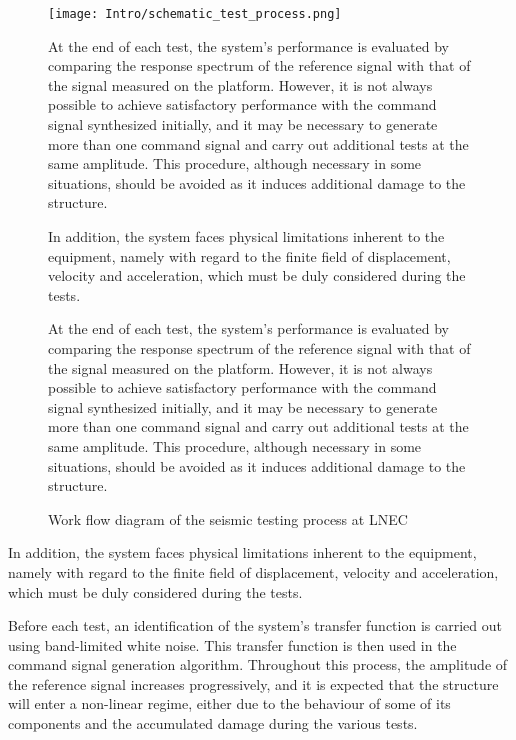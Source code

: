 \documentclass[9pt]{extarticle}
\begin{document}
\begin{figure}[H]
\begin{minipage}{0.4\textwidth}
    \centering
    \texttt{[image: Intro/schematic\_test\_process.png]}
    \caption{Work flow diagram of the seismic testing process at LNEC}
    \label{schematic_test_process}
\end{minipage}
\hfill
\begin{minipage}{0.55\textwidth} \setlength{\parindent}{4pt}

\hspace*{\parindent} At the end of each test, the system's performance is evaluated by comparing the response spectrum of the reference signal with that of the signal measured on the platform. However, it is not always possible to achieve satisfactory performance with the command signal synthesized initially, and it may be necessary to generate more than one command signal and carry out additional tests at the same amplitude. This procedure, although necessary in some situations, should be avoided as it induces additional damage to the structure.

\hspace*{\parindent} In addition, the system faces physical limitations inherent to the equipment, namely with regard to the finite field of displacement, velocity and acceleration, which must be duly considered during the tests.

\hspace*{\parindent} At the end of each test, the system's performance is evaluated by comparing the response spectrum of the reference signal with that of the signal measured on the platform. However, it is not always possible to achieve satisfactory performance with the command signal synthesized initially, and it may be necessary to generate more than one command signal and carry out additional tests at the same amplitude. This procedure, although necessary in some situations, should be avoided as it induces additional damage to the structure.

\end{minipage}
\end{figure}

In addition, the system faces physical limitations inherent to the equipment, namely with regard to the finite field of displacement, velocity and acceleration, which must be duly considered during the tests.

Before each test, an identification of the system's transfer function is carried out using band-limited white noise.%
This transfer function is then used in the command signal generation algorithm. Throughout this process, the amplitude of the reference signal increases progressively, and it is expected that the structure will enter a non-linear regime, either due to the behaviour of some of its components and the accumulated damage during the various tests.
\end{document}
